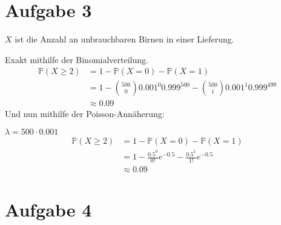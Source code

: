 \documentclass[10pt,a4paper,parskip=half]{scrartcl}
\begin{document}
\section*{Aufgabe 3}
$X$ ist die Anzahl an unbrauchbaren Birnen in einer Lieferung.

Exakt mithilfe der Binomialverteilung.
\begin{align*}
\mathbb P(X \ge 2) &= 1 - \mathbb P(X = 0) - \mathbb P(X = 1)\\
&= 1 - {500 \choose 0 } 0.001^0 0.999^500 - {500 \choose 1 } 0.001^1 0.999^499\\
&\approx 0.09
\end{align*}
Und nun mithilfe der Poisson-Annäherung:

$\lambda = 500 \cdot 0.001$
\begin{align*}
\mathbb P(X \ge 2) &= 1 - \mathbb P(X = 0) - \mathbb P(X = 1)\\
&= 1 - \frac{0.5^0}{0!}e^{-0.5} - \frac{0.5^1}{1!}e^{-0.5}\\
& \approx 0.09
\end{align*}
\section*{Aufgabe 4}
\end{document}
